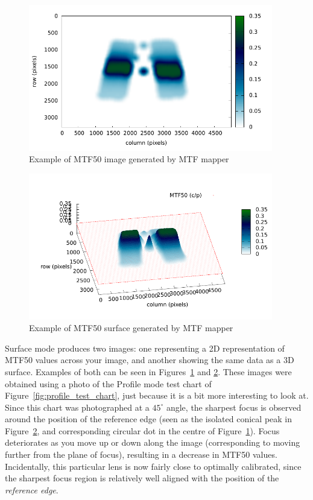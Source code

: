 \documentclass[a4paper]{article}
\begin{document}
\begin{figure}
\centering
\includegraphics[width=0.95\textwidth]{figures/sample_grid_image}
\caption{Example of MTF50 image generated by MTF mapper}
\label{fig:sample_grid_image}
\end{figure}

\begin{figure}
\centering
\includegraphics[width=0.95\textwidth]{figures/sample_grid_surface}
\caption{Example of MTF50 surface generated by MTF mapper}
\label{fig:sample_grid_surface}
\end{figure}

Surface mode produces two images: one representing a 2D
representation of MTF50 values across your image, and another showing the
same data as a 3D surface. Examples of both can be seen in
Figures~\ref{fig:sample_grid_image} and \ref{fig:sample_grid_surface}. These
images were obtained using a photo of the Profile mode test chart of
Figure~\ref{fig:profile_test_chart}, just because it is a bit more
interesting to look at. Since this chart was photographed at a $45^\circ$
angle, the sharpest focus is observed around the position of the reference
edge (seen as the isolated conical peak in
Figure~\ref{fig:sample_grid_surface}, and corresponding circular dot in the
centre of Figure~\ref{fig:sample_grid_image}). Focus deteriorates as you
move up or down along the image (corresponding to moving further from the
plane of focus), resulting in a decrease in MTF50 values. Incidentally, this
particular lens is now fairly close to optimally calibrated, since the
sharpest focus region is relatively well aligned with the position of the
\emph{reference edge}.
\end{document}
